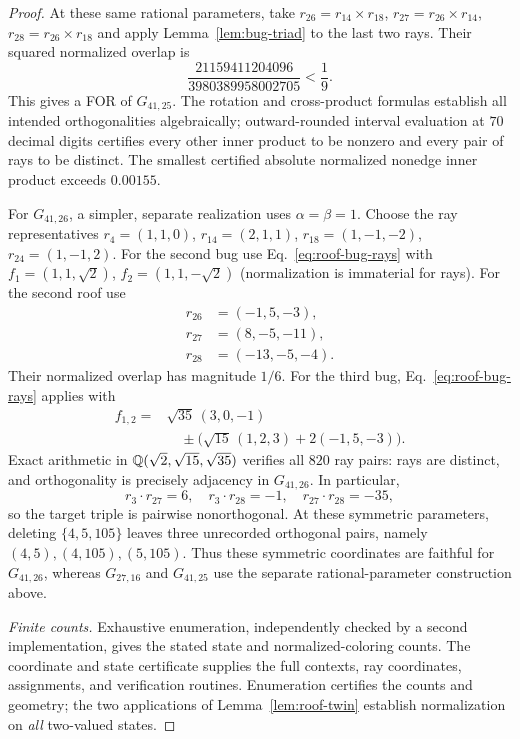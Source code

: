 \documentclass[aps,pra,reprint,superscriptaddress,longbibliography,nofootinbib,floatfix,10pt]{revtex4-2}
\theoremstyle{definition}\newtheorem{definition}[theorem]{Definition}
\theoremstyle{remark}\newtheorem{remark}[theorem]{Remark}
\begin{document}
\begin{proof}
At these same rational parameters, take $r_{26}=r_{14}\times r_{18}$, $r_{27}=r_{26}\times r_{14}$, $r_{28}=r_{26}\times r_{18}$ and apply Lemma~\ref{lem:bug-triad} to the last two rays. Their squared normalized overlap is
\[
\frac{21159411204096}{3980389958002705}<\frac19.
\]
This gives a FOR of $G_{41,25}$. The rotation and cross-product formulas establish all intended orthogonalities algebraically; outward-rounded interval evaluation at $70$ decimal digits certifies every other inner product to be nonzero and every pair of rays to be distinct. The smallest certified absolute normalized nonedge inner product exceeds $0.00155$.

For $G_{41,26}$, a simpler, separate realization uses $\alpha=\beta=1$. Choose the ray representatives $r_4=(1,1,0)$, $r_{14}=(2,1,1)$, $r_{18}=(1,-1,-2)$, $r_{24}=(1,-1,2)$. For the second bug use Eq.~\eqref{eq:roof-bug-rays} with $f_1=(1,1,\sqrt2)$, $f_2=(1,1,-\sqrt2)$ (normalization is immaterial for rays). For the second roof use
\begin{equation}\label{eq:G41-vectors}
\begin{aligned}
r_{26}&=(-1,5,-3),\\
r_{27}&=(8,-5,-11),\\
r_{28}&=(-13,-5,-4).
\end{aligned}
\end{equation}
Their normalized overlap has magnitude $1/6$. For the third bug, Eq.~\eqref{eq:roof-bug-rays} applies with
\begin{equation}\label{eq:roof-third-triad}
\begin{aligned}
f_{1,2}={}&\sqrt{35}\,(3,0,-1)\\
&\quad\pm\bigl(\sqrt{15}\,(1,2,3)+2(-1,5,-3)\bigr).
\end{aligned}
\end{equation}
Exact arithmetic in $\mathbb Q(\sqrt2,\sqrt{15},\sqrt{35})$ verifies all $820$ ray pairs: rays are distinct, and orthogonality is precisely adjacency in $G_{41,26}$. In particular,
\[
r_3\cdot r_{27}=6,\quad r_3\cdot r_{28}=-1,\quad
r_{27}\cdot r_{28}=-35,
\]
so the target triple is pairwise nonorthogonal. At these symmetric parameters, deleting $\{4,5,105\}$ leaves three unrecorded orthogonal pairs, namely $(4,5),(4,105),(5,105)$. Thus these symmetric coordinates are faithful for $G_{41,26}$, whereas $G_{27,16}$ and $G_{41,25}$ use the separate rational-parameter construction above.

\emph{Finite counts.} Exhaustive enumeration, independently checked by a second implementation, gives the stated state and normalized-coloring counts. The coordinate and state certificate supplies the full contexts, ray coordinates, assignments, and verification routines. Enumeration certifies the counts and geometry; the two applications of Lemma~\ref{lem:roof-twin} establish normalization on \emph{all} two-valued states.
\end{proof}
\end{document}
